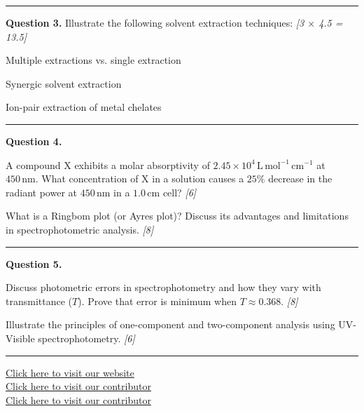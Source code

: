 \documentclass[11pt,a4paper]{article}
\newcommand{\pts}[1]{\hfill   \textit{[#1]}}
\begin{document}
\medskip\rule{\linewidth}{0.2pt}




\noindent   \textbf{Question 3.} Illustrate the following solvent extraction techniques: \pts{3 $ \times$ 4.5 = 13.5}

\begin{parts}
  \item Multiple extractions vs. single extraction
  \item Synergic solvent extraction
  \item Ion-pair extraction of metal chelates
\end{parts}

\medskip\rule{\linewidth}{0.2pt}




\noindent   \textbf{Question 4.}

\begin{parts}
  \item A compound X exhibits a molar absorptivity of $2.45  \times 10^4\, \text{L}\, \text{mol}^{-1}\, \text{cm}^{-1}$ at $450\, \text{nm}$. What concentration of X in a solution causes a $25\%$ decrease in the radiant power at $450\, \text{nm}$ in a $1.0\, \text{cm}$ cell? \pts{6}
  \item What is a Ringbom plot (or Ayres plot)? Discuss its advantages and limitations in spectrophotometric analysis. \pts{8}
\end{parts}

\medskip\rule{\linewidth}{0.2pt}




\noindent   \textbf{Question 5.}

\begin{parts}
  \item Discuss photometric errors in spectrophotometry and how they vary with transmittance ($T$). Prove that error is minimum when $T \approx 0.368$. \pts{8}
  \item Illustrate the principles of one-component and two-component analysis using UV-Visible spectrophotometry. \pts{6}
\end{parts}

\vfill
\rule{\linewidth}{0.4pt}

\begin{center}\small
  \href{https://bhu-exam.vercel.app/}{Click here to visit our website}\\[4pt]
  \href{https://me-aryan.vercel.app/}{Click here to visit our contributor}\\[4pt]
  \href{https://quashan-me.vercel.app/}{Click here to visit our contributor}
\end{center}
\end{document}
